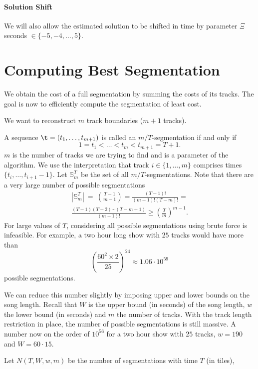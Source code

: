 \documentclass[twocolumn]{article}
\newcommand{\segs}{\mathbb S}
\begin{document}
		
	\paragraph{Solution Shift}
	
	We will also allow the estimated solution to be shifted in time by parameter $\varXi$ seconds $\in \{-5,-4,\ldots,5\}$.
	
	\section{Computing Best Segmentation}\label{best_cost}
	
	We obtain the cost of a full segmentation by summing the costs of its tracks. The goal is now to efficiently compute the segmentation of least cost.
	
	We want to reconstruct $m$ track boundaries ($m+1$ tracks).
	
	A sequence $\t = (t_1, \ldots, t_{m+1})$ is called an $m/T$-segmentation if and only if
	\[
	1 = t_1 < \ldots < t_m < t_{m+1} = T+1.
	\]
	$m$ is the number of tracks we are trying to find and is a parameter of the algorithm. We use the interpretation that track $i \in \{1, \ldots, m\}$ comprises times $\{t_i, \ldots, t_{i+1}-1\}$. Let $\segs^T_m$ be the set of all $m/T$-segmentations. Note that there are a very large number of possible segmentations 
	\begin{multline*}
		|\segs^T_m| ~=~ \binom{T-1}{m-1}
		= \frac{(T-1)!}{(m-1)!(T-m)!} =\\
		\frac{(T-1)(T-2)\cdots(T-m+1)}{(m-1)!} \ge \left( \frac{T}{m}\right)^{m-1}.
	\end{multline*} 
	For large values of $T$, considering all possible segmentations using brute force is infeasible. For example, a two hour long show with $25$ tracks would have more than 
	\[
	\left( \frac{60^2 \times 2}{25}\right)^{24}  \approx 1.06 \cdot 10^{59}
	\] possible segmentations. 
	
	We can reduce this number slightly by imposing upper and lower bounds on the song length.  Recall that $W$ is the upper bound (in seconds) of the song length, $w$ the lower bound (in seconds) and $m$ the number of tracks. With the track length restriction in place, the number of possible segmentations is still massive. A number now on the order of $10^{56}$ for a two hour show with $25$ tracks, $w=190$ and $W=60\cdot15$.
	
	Let $N(T,W,w,m)$ be the number of segmentations with time $T$ (in tiles),
	
\end{document}

